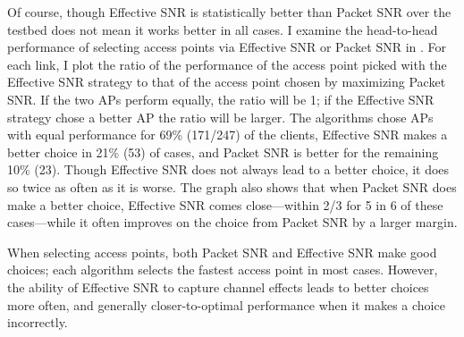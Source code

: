 Of course, though Effective SNR is statistically better than Packet SNR over the testbed does not mean it works better in all cases. I examine the head-to-head performance of selecting access points via Effective SNR or Packet SNR in . For each link, I plot the ratio of the performance of the access point picked with the Effective SNR strategy to that of the access point chosen by maximizing Packet SNR. If the two APs perform equally, the ratio will be 1; if the Effective SNR strategy chose a better AP the ratio will be larger. The algorithms chose APs with equal performance for 69\% (171/247) of the clients, Effective SNR makes a better choice in 21\% (53) of cases, and Packet SNR is better for the remaining 10\% (23). Though Effective SNR does not always lead to a better choice, it does so twice as often as it is worse. The graph also shows that when Packet SNR does make a better choice, Effective SNR comes close---within 2/3 for 5 in 6 of these cases---while it often improves on the choice from Packet SNR by a larger margin.


 When selecting access points, both Packet SNR and Effective SNR make good choices; each algorithm selects the fastest access point in most cases. However, the ability of Effective SNR to capture channel effects leads to better choices more often, and generally closer-to-optimal performance when it makes a choice incorrectly.


